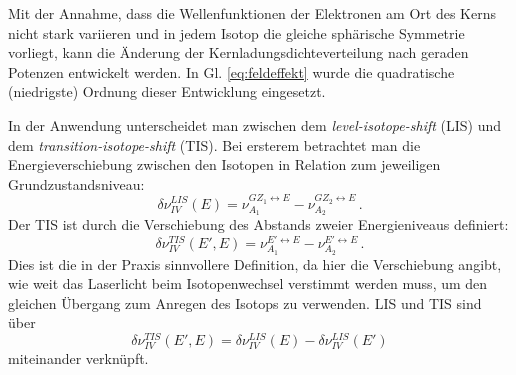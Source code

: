 Mit der Annahme, dass die Wellenfunktionen der Elektronen am Ort des Kerns
nicht stark variieren und in jedem Isotop die gleiche sphärische Symmetrie
vorliegt, kann die Änderung der Kernladungsdichteverteilung nach geraden
Potenzen entwickelt werden. In Gl. \eqref{eq:feldeffekt} wurde
die quadratische (niedrigste) Ordnung dieser Entwicklung eingesetzt.\par
In der Anwendung unterscheidet man zwischen dem \textit{level-isotope-shift}
(LIS) und dem \textit{transition-isotope-shift} (TIS). Bei ersterem betrachtet
man die Energieverschiebung zwischen den Isotopen in Relation zum jeweiligen
Grundzustandsniveau:
\begin{equation}\label{eq:LIS}
	\delta\nu_{IV}^{LIS}(E)=\nu_{A_1}^{GZ_1\leftrightarrow
	E}-\nu_{A_2}^{GZ_2\leftrightarrow E}\,.
\end{equation}
Der TIS ist durch die Verschiebung des Abstands zweier Energieniveaus definiert:
\begin{equation}\label{eq:TIS}
	\delta\nu_{IV}^{TIS}(E',E)=\nu_{A_1}^{E'\leftrightarrow
	E}-\nu_{A_2}^{E'\leftrightarrow E}\,.
\end{equation}
Dies ist die in der Praxis sinnvollere Definition, da hier die Verschiebung
angibt, wie weit das Laserlicht beim Isotopenwechsel verstimmt werden muss, um
den gleichen Übergang zum Anregen des Isotops zu verwenden. LIS und TIS sind
über
\begin{equation}\label{eq:TIS_LIS_verknuepfung}
	\delta\nu_{IV}^{TIS}(E',E)=\delta\nu_{IV}^{LIS}(E)-\delta\nu_{IV}^{LIS}(E')
\end{equation}
miteinander verknüpft.

